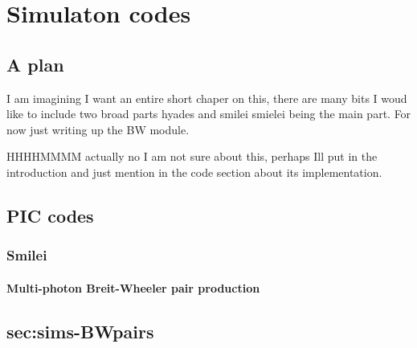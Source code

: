 \chapter{\label{ch:2-simulations}Simulaton codes} 

\minitoc

\section{A plan}
I am imagining I want an entire short chaper on this, there are many bits I woud like to include 
two broad parts
hyades and smilei
smielei being the main part. For now just writing up the BW module.

HHHHMMMM actually no I am not sure about this, perhaps Ill put in the introduction and just mention in the code section about its implementation.

\section{PIC codes}

\subsection{Smilei}


\subsubsection{Multi-photon Breit-Wheeler pair production}\section{sec:sims-BWpairs}
